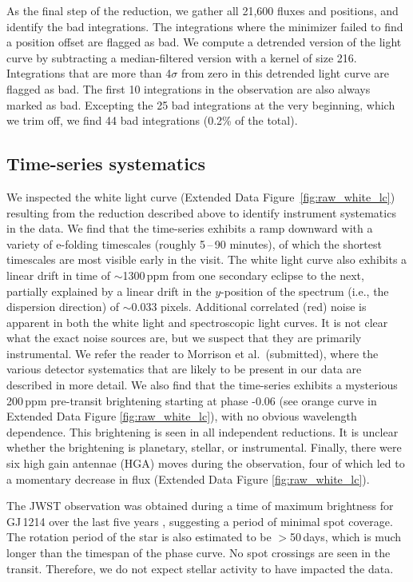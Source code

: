 \documentclass[pdflatex,sn-standardnature]{sn-jnl}%
\begin{document}
As the final step of the reduction, we gather all 21,600 fluxes and positions, and identify the bad integrations.  The integrations where the minimizer failed to find a position offset are flagged as bad.  We compute a detrended version of the light curve by subtracting a median-filtered version with a kernel of size 216.  Integrations that are more than 4$\sigma$ from zero in this detrended light curve are flagged as bad.  The first 10 integrations in the observation are also always marked as bad.  Excepting the 25 bad integrations at the very beginning, which we trim off, we find 44 bad integrations (0.2\% of the total).

\subsection*{Time-series systematics}
We inspected the white light curve (Extended Data Figure~\ref{fig:raw_white_lc}) resulting from the reduction described above to identify instrument systematics in the data. We find that the time-series exhibits a ramp downward with a variety of e-folding timescales (roughly 5\,--\,90 minutes), of which the shortest timescales are most visible early in the visit.  The white light curve also exhibits a linear drift in time of $\sim$1300\,ppm from one secondary eclipse to the next, partially explained by a linear drift in the $y$-position of the spectrum (i.e., the dispersion direction) of $\sim$0.033 pixels.  
Additional correlated (red) noise is apparent in both the white light and spectroscopic light curves.  It is not clear what the exact noise sources are, but we suspect that they are primarily instrumental. We refer the reader to Morrison et al.\ (submitted), where the various detector systematics that are likely to be present in our data are described in more detail.   We also find that the time-series exhibits a mysterious 200\,ppm pre-transit brightening starting at phase -0.06 (see orange curve in Extended Data Figure \ref{fig:raw_white_lc}), with no obvious wavelength dependence.  This brightening is seen in all independent reductions.  It is unclear whether the brightening is planetary, stellar, or instrumental.  Finally, there were six high gain antennae (HGA) moves during the observation, four of which led to a momentary decrease in flux (Extended Data Figure \ref{fig:raw_white_lc}).

The JWST observation was obtained during a time of maximum brightness for GJ\,1214 over the last five years \citep{henry23}, suggesting a period of minimal spot coverage. The rotation period of the star is also estimated to be $>$50\,days, which is much longer than the timespan of the phase curve. No spot crossings are seen in the transit. Therefore, we do not expect stellar activity to have impacted the data.
\end{document}
